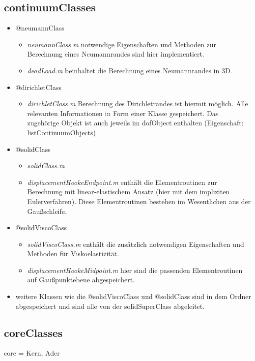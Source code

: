 \documentclass[12pt,bibstyle=none,pagenumberinfooter]{ifmdocument}
\begin{document}
	\subsection{continuumClasses}
		\begin{itemize}
			\item @neumannClass
			\begin{itemize}
				\item \textit{neumannClass.m} notwendige Eigenschaften und Methoden zur Berechnung eines Neumannrandes sind hier implementiert.
				\item \textit{deadLoad.m} beinhaltet die Berechnung eines Neumannrandes in 3D.
			\end{itemize}
			\item @dirichletClass 
			\begin{itemize}
				\item \textit{dirichletClass.m} Berechnung des Dirichletrandes ist hiermit m\"oglich. Alle relevanten Informationen in Form einer Klasse gespeichert. Das zugeh\"orige Objekt ist auch jeweils im dofObject enthalten (Eigenschaft: listContinuumObjects) 
			\end{itemize}
			\item @solidClass 
			\begin{itemize}
				\item \textit{solidClass.m}
				\item \textit{displacementHookeEndpoint.m} enth\"alt die Elementroutinen zur Berechnung mit linear-elastischem Ansatz (hier mit dem impliziten Eulerverfahren). Diese Elementroutinen bestehen im Wesentlichen aus der Gaußschleife. 
			\end{itemize}
			\item @solidViscoClass 
			\begin{itemize}
				\item \textit{solidViscoClass.m} enth\"alt die zus\"atzlich notwendigen 
				Eigenschaften und Methoden f\"ur Viskoelastizit\"at.
				\item \textit{displacementHookeMidpoint.m} hier sind die passenden Elementroutinen auf Gaußpunktebene abgespeichert.
			\end{itemize}
			\item weitere Klassen wie die @solidViscoClass und @solidClass sind in dem Ordner abgespeichert und sind alle von der solidSuperClass abgeleitet. 
		\end{itemize}
	\subsection{coreClasses}
	core = Kern, Ader
	
\end{document}
